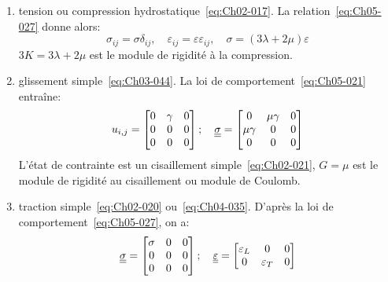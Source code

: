 \begin{enumerate}
    \item tension ou compression hydrostatique~\eqref{eq:Ch02-017}.
        La relation~\eqref{eq:Ch05-027} donne alors:
        \begin{equation}
            \sigma_{ij} = \sigma \delta_{ij}, \quad \varepsilon_{ij} = \varepsilon \varepsilon_{ij}, \quad \sigma = \left( 3 \lambda + 2 \mu \right) \varepsilon
            \label{eq:Ch05-028}
        \end{equation}
        $3 K = 3 \lambda + 2 \mu$ est le module de rigidité à la compression.
    \item glissement simple~\eqref{eq:Ch03-044}.
        La loi de comportement~\eqref{eq:Ch05-021} entraîne:
        \begin{equation}
            u_{i,j} = 
            \begin{bmatrix}
                0 & \gamma & 0 \\
                0 & 0 & 0 \\
                0 & 0 & 0
            \end{bmatrix};\quad
            \underline{\underline{\sigma}} = 
            \begin{bmatrix}
                0 & \mu\gamma & 0 \\
                \mu\gamma & 0 & 0 \\
                0 & 0 & 0
            \end{bmatrix}
            \label{eq:Ch05-029}
        \end{equation}
        L'état de contrainte est un cisaillement simple~\eqref{eq:Ch02-021}, $G=\mu$ est le module de rigidité au cisaillement ou module de Coulomb.
    \item traction simple~\eqref{eq:Ch02-020} ou~\eqref{eq:Ch04-035}.
        D'après la loi de comportement~\eqref{eq:Ch05-027}, on a: 
        \begin{equation}
            \underline{\underline{\sigma}} = 
            \begin{bmatrix}
                \sigma & 0 & 0 \\
                0 & 0 & 0 \\
                0 & 0 & 0
            \end{bmatrix};
            \quad
            \underline{\underline{\varepsilon}} = 
            \begin{bmatrix}
                \varepsilon_L & 0 & 0 \\
                0 & \varepsilon_T & 0 \\

\end{bmatrix}
\end{equation}
\end{enumerate}
